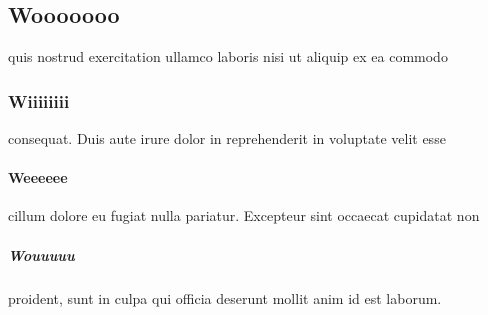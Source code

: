 	\subsection{Wooooooo}
		quis nostrud exercitation ullamco laboris nisi ut aliquip ex ea commodo
		\subsubsection{Wiiiiiiii}
			consequat. Duis aute irure dolor in reprehenderit in voluptate velit esse
			\paragraph{Weeeeee}
				cillum dolore eu fugiat nulla pariatur. Excepteur sint occaecat cupidatat non
				\subparagraph{Wouuuuu}
					proident, sunt in culpa qui officia deserunt mollit anim id est laborum.
